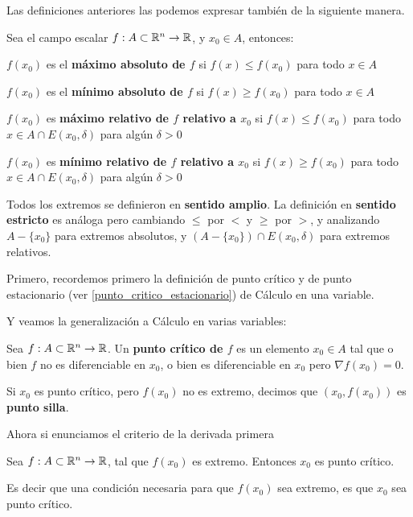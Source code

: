 \begin{observation}
Las definiciones anteriores las podemos expresar también de la siguiente manera.

Sea el campo escalar $ f : A \subset \mathbb{R}^n \to \mathbb{R}$, y $ x_0 \in A$, entonces:

$ f(x_0)$ es el \textbf{máximo absoluto de $f$} si $ f(x) \leq f(x_0)$ para todo $x \in A$

$ f(x_0)$ es el \textbf{mínimo absoluto de $f$} si $ f(x) \geq f(x_0)$ para todo $x \in A$

$ f(x_0)$ es \textbf{máximo relativo de $f$ relativo a $x_0$} si $ f(x) \leq f(x_0)$ para todo $x \in A \cap E(x_0, \delta)$ para algún $\delta > 0$

$ f(x_0)$ es \textbf{mínimo relativo de $f$ relativo a $x_0$} si $ f(x) \geq f(x_0)$ para todo $x \in A \cap E(x_0, \delta)$ para algún $\delta > 0$
\end{observation}

\begin{observation}
Todos los extremos se definieron en \textbf{sentido amplio}. La definición en \textbf{sentido estricto} es análoga pero cambiando $\leq$ por $<$ y $\geq$ por $>$, y analizando $A - \{x_0\}$ para extremos absolutos, y $( A - \{x_0\} ) \cap E(x_0, \delta)$ para extremos relativos.
\end{observation}

Primero, recordemos primero la definición de punto crítico y de punto estacionario (ver \ref{punto_critico_estacionario}) de Cálculo en una variable.

Y veamos la generalización a Cálculo en varias variables:

\begin{definition} \label{punto_critico_silla}
Sea $f : A \subset \mathbb{R}^n \to \mathbb{R}$.  Un \textbf{punto crítico de $f$}  es un elemento $x_0 \in A$ tal que o bien $f$ no es diferenciable en $x_0$, o bien es diferenciable en $x_0$ pero $ \nabla f(x_0) = 0$.

Si $x_0$ es punto crítico, pero $f(x_0)$ no es extremo, decimos que $(x_0, f(x_0))$ es \textbf{punto silla}. 
\end{definition}

Ahora si enunciamos el criterio de la derivada primera

\begin{theorem} \label{criterio_derivada_primera} 
Sea $f : A \subset \mathbb{R}^n \to \mathbb{R}$, tal que $f(x_0)$ es extremo.  Entonces $x_0$ es punto crítico.

Es decir que una condición necesaria para que $f(x_0)$ sea extremo, es que $x_0$ sea punto crítico.
\end{theorem}

